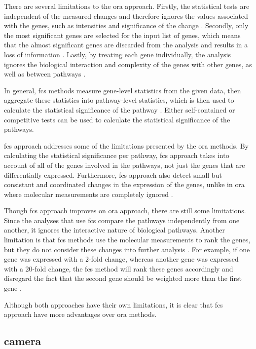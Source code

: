 There are several limitations to the \gls{ora} approach.
Firstly, the statistical tests are independent of the measured changes and therefore ignores the values associated with the genes, such as intensities and significance of the change \citep{Khatri2012}.
Secondly, only the most significant genes are selected for the input list of genes, which means that the almost significant genes are discarded from the analysis and results in a loss of information \citep{Khatri2012}.
Lastly, by treating each gene individually, the analysis ignores the biological interaction and complexity of the genes with other genes, as well as between pathways \citep{Khatri2012}.

In general, \gls{fcs} methods measure gene-level statistics from the given data, then aggregate these statistics into pathway-level statistics, which is then used to calculate the statistical significance of the pathway \citep{Khatri2012}.
Either self-contained or competitive tests can be used to calculate the statistical significance of the pathways.

\Gls{fcs} approach addresses some of the limitations presented by the \gls{ora} methods.
By calculating the statistical significance per pathway, \gls{fcs} approach takes into account of all of the genes involved in the pathways, not just the genes that are differentially expressed.
Furthermore, \gls{fcs} approach also detect small but consistant and coordinated changes in the expression of the genes, unlike in \gls{ora} where molecular measurements are completely ignored \citep{Khatri2012}.

Though \gls{fcs} approach improves on \gls{ora} approach, there are still some limitations.
Since the analyses that use \gls{fcs} compare the pathways independently from one another, it ignores the interactive nature of biological pathways.
Another limitation is that \gls{fcs} methods use the molecular measurements to rank the genes, but they do not consider these changes into further analysis \citep{Khatri2012}.
For example, if one gene was expressed with a 2-fold change, whereas another gene was expressed with a 20-fold change, the \gls{fcs} method will rank these genes accordingly and disregard the fact that the second gene should be weighted more than the first gene \citep{Khatri2012}.

Although both approaches have their own limitations, it is clear that \gls{fcs} approach have more advantages over \gls{ora} methods.

\subsection{\Gls{camera}}
\label{sub:camera}

